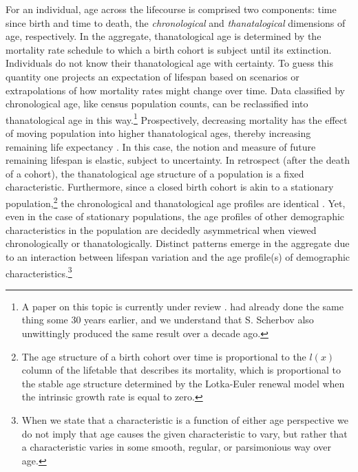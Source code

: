 \documentclass{article}
\begin{document}
For an
individual, age across the lifecourse is comprised two components: time since
birth and time to death, the \textit{chronological} and \textit{thanatalogical}
dimensions of age, respectively. In the aggregate, thanatological age is determined
by the mortality rate schedule to which a birth cohort is subject until its
extinction. Individuals do not know their thanatological age with certainty. To
guess this quantity one projects an expectation of lifespan based on scenarios
or extrapolations of how mortality rates might change over time. Data classified by chronological age, like census population counts, can be
reclassified into thanatological age in this way.\footnote{A paper on this topic
is currently under review \citep{riffe2014paaposter}. \citet{brouard1986structure, brouard1989mouvements} had already done the same thing some 30 years earlier, and we understand that
S. Scherbov also unwittingly produced the same result over a decade ago.}
Prospectively, decreasing mortality has the effect of moving population into higher thanatological ages, thereby increasing
remaining life expectancy \citep{sanderson2005average}. In this case,
the notion and measure of future remaining lifespan is elastic, subject to uncertainty.
In retrospect (after the death of a cohort), the thanatological age structure of
a population is a fixed characteristic. Furthermore, since a closed birth cohort
is akin to a stationary population,\footnote{The age structure of a birth cohort over time is proportional to the $l(x)$ column of the lifetable that describes its
mortality, which is proportional to the stable age structure determined by
the Lotka-Euler renewal model when the intrinsic growth rate is equal to zero.}
the chronological and thanatological age profiles are identical
\citep{brouard1989mouvements,vaupel2009life,rao2014generalization}. Yet, even in
the case of stationary populations, the age profiles of other demographic characteristics
in the population are decidedly asymmetrical when viewed chronologically or thanatologically. Distinct patterns emerge in the
aggregate due to an interaction between lifespan variation and the age profile(s) of
demographic characteristics.\footnote{When we state that a characteristic is a
function of either age perspective we do not imply that age causes the given
characteristic to vary, but rather that a characteristic varies in some smooth, regular, or parsimonious
way over age.}
\end{document}
